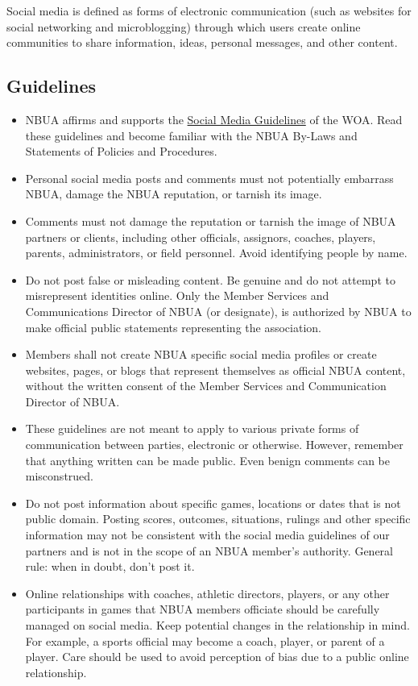 \documentclass[letterpaper,11pt,colorlinks=true,allcolors=blue]{article}
\begin{document}
Social media is defined as forms of electronic communication (such as websites for social networking and microblogging) through which users create online communities to share information, ideas, personal messages, and other content.

\subsection{Guidelines}

\begin{itemize}
    \item NBUA affirms and supports the \href{https://www1.arbitersports.com/Groups/104759/Library/files/SocialMediaGuidelines.pdf}{Social Media Guidelines} of the WOA.  Read these guidelines and become familiar with the NBUA By-Laws and Statements of Policies and Procedures.
    \item Personal social media posts and comments must not potentially embarrass NBUA, damage the NBUA reputation, or tarnish its image.  
    \item Comments must not damage the reputation or tarnish the image of NBUA partners or clients, including other officials, assignors, coaches, players, parents, administrators, or field personnel.  Avoid identifying people by name.
    \item Do not post false or misleading content.  Be genuine and do not attempt to misrepresent identities online.  Only the Member Services and Communications Director of NBUA (or designate), is authorized by NBUA to make official public statements representing the association.
    \item Members shall not create NBUA specific social media profiles or create websites, pages, or blogs that represent themselves as official NBUA content, without the written consent of the Member Services and Communication Director of NBUA.
    \item These guidelines are not meant to apply to various private forms of communication between parties, electronic or otherwise.  However, remember that anything written can be made public. Even benign comments can be misconstrued. 
    \item Do not post information about specific games, locations or dates that is not public domain. Posting scores, outcomes, situations, rulings and other specific information may not be consistent with the social media guidelines of our partners and is not in the scope of an NBUA member’s authority. General rule: when in doubt, don’t post it.
    \item Online relationships with coaches, athletic directors, players, or any other participants in games that NBUA members officiate should be carefully managed on social media. Keep potential changes in the relationship in mind. For example, a sports official may become a coach, player, or parent of a player. Care should be used to avoid perception of bias due to a public online relationship.
\end{itemize}
\end{document}

